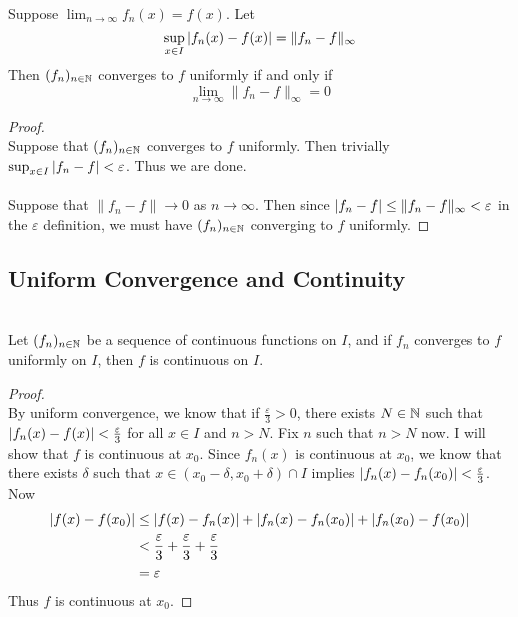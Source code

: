 \documentclass[a4paper]{article}
\begin{document}
\begin{prp}{}{}\\ Suppose $\lim_{n\to\infty}f_n(x)=f(x)$. Let $$\sup_{x\in I}\abs{f_n(x)-f(x)}=\|f_n-f\|_\infty$$ Then $(f_n)_{n\in\mathbb{N}}$ converges to $f$ uniformly if and only if $$\lim_{n\to\infty}\|f_n-f\|_\infty=0$$ 
\begin{proof}\\
Suppose that $(f_n)_{n\in\mathbb{N}}$ converges to $f$ uniformly. Then trivially $\sup_{x\in I}\abs{f_n-f}<\varepsilon$. Thus we are done. \\~\\
Suppose that $\|f_n-f\|\to 0$ as $n\to\infty$. Then since $\abs{f_n-f}\leq\|f_n-f\|_\infty<\varepsilon$ in the $\varepsilon$ definition, we must have $(f_n)_{n\in\mathbb{N}}$ converging to $f$ uniformly. 
\end{proof}
\end{prp}

\subsection{Uniform Convergence and Continuity}
\begin{thm}{}{}\\ Let $(f_n)_{n\in\mathbb{N}}$ be a sequence of continuous functions on $I$, and if $f_n$ converges to $f$ uniformly on $I$, then $f$ is continuous on $I$. 
\begin{proof}\\ By uniform convergence, we know that if $\frac{\varepsilon}{3}>0$, there exists $N\in\mathbb{N}$ such that $\abs{f_n(x)-f(x)}<\frac{\varepsilon}{3}$ for all $x\in I$ and $n>N$. Fix $n$ such that $n>N$ now. I will show that $f$ is continuous at $x_0$. Since $f_n(x)$ is continuous at $x_0$, we know that there exists $\delta$ such that $x\in(x_0-\delta,x_0+\delta)\cap I$ implies $\abs{f_n(x)-f_n(x_0)}<\frac{\varepsilon}{3}$. Now
\begin{align*}
\abs{f(x)-f(x_0)}&\leq\abs{f(x)-f_n(x)}+\abs{f_n(x)-f_n(x_0)}+\abs{f_n(x_0)-f(x_0)}\\
&<\frac{\varepsilon}{3}+\frac{\varepsilon}{3}+\frac{\varepsilon}{3}\\
&=\varepsilon
\end{align*}
Thus $f$ is continuous at $x_0$. 
\end{proof}
\end{thm}
\end{document}
